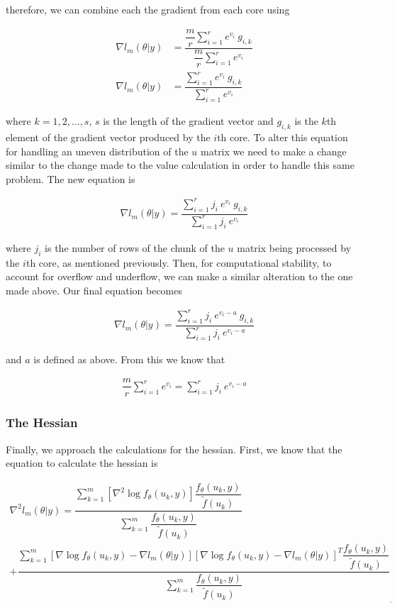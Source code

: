 \documentclass{article}
\begin{document}
\noindent therefore, we can combine each the gradient from each core using

\begin{align}
\nabla l_m(\theta|y) &=\dfrac{\dfrac{m}{r} \sum\limits_{i=1}^r e^{v_i} \ g_{i,k}}{\dfrac{m}{r} \sum\limits_{i=1}^r e^{v_i}} \\
\nabla l_m(\theta|y) &=\dfrac{ \sum\limits_{i=1}^r e^{v_i} \ g_{i,k}}{\sum\limits_{i=1}^r e^{v_i}}
\end{align}

\noindent where $k = 1, 2, \ldots, s$,  $s$ is the length of the gradient vector and $g_{i,k}$ is the $k$th element of the gradient vector produced by the $i$th core. To alter this equation for handling an uneven distribution of the $u$ matrix we need to make a change similar to the change made to the value calculation in order to handle this same problem. The new equation is

\begin{align}
\nabla l_m(\theta|y) =\dfrac{ \sum\limits_{i=1}^r j_i \ e^{v_i} \ g_{i,k}}{\sum\limits_{i=1}^r j_i \ e^{v_i}}
\end{align}

\noindent where $j_i$ is the number of rows of the chunk of the $u$ matrix being processed by the $i$th core, as mentioned previously. Then, for computational stability, to account for overflow and underflow, we can make a similar alteration to the one made above. Our final equation becomes

\begin{align}
\nabla l_m(\theta|y) =\dfrac{ \sum\limits_{i=1}^r j_i \ e^{v_i - a} \ g_{i,k}}{\sum\limits_{i=1}^r j_i \ e^{v_i - a}}
\end{align}

\noindent and $a$ is defined as above. From this we know that

\begin{align}
\dfrac{m}{r} \sum\limits_{i=1}^r e^{v_i} = \sum\limits_{i=1}^r j_i \ e^{v_i - a}
\end{align}

\subsubsection{The Hessian}
Finally, we approach the calculations for the hessian. First, we know that the equation to calculate the hessian is 

\begin{multline}
\nabla^2 l_m(\theta|y)= \dfrac{   \sum_{k=1}^m \left[ \nabla^2 \log f_\theta(u_k,y)     \right]  \dfrac{ f_\theta(u_k,y)}{\tilde{f}(u_k)}  }{\sum_{k=1}^m  \dfrac{ f_\theta(u_k,y)   }{\tilde{f}(u_k)}}\\
+ \dfrac{   \sum_{k=1}^m \left[ \nabla \log f_\theta(u_k,y)  - \nabla l_m(\theta|y)   \right] \left[ \nabla \log f_\theta(u_k,y)  -\nabla l_m(\theta|y)  \right]^T  \dfrac{ f_\theta(u_k,y)   }{\tilde{f}(u_k)}   }{\sum_{k=1}^m  \dfrac{ f_\theta(u_k,y)   }{\tilde{f}(u_k)}}_.
\end{multline}
\end{document}
